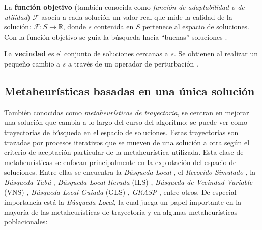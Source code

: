 \begin{definicion}
La \textbf{función objetivo} (también conocida como \emph{función de adaptabilidad o de utilidad}) $\mathcal{F}$ asocia a cada solución un valor real que mide la calidad de la solución: $\mathcal{F}: S \rightarrow \mathbb{R}$, donde $s$ contenida en $S$ pertenece al espacio de soluciones. Con la función objetivo se guía la búsqueda hacia ``buenas'' soluciones \cite{talbi2009metaheuristics}.\\
\end{definicion}


\begin{definicion}
La \textbf{vecindad} es el conjunto de soluciones cercanas a $s$. Se obtienen al realizar un pequeño cambio a $s$ a través de un operador de perturbación \cite{talbi2009metaheuristics}.
\end{definicion}

\subsection{Metaheurísticas basadas en una única solución}

También conocidas como \emph{metaheurísticas de trayectoria}, se centran en mejorar una solución que cambia a lo largo del curso del algoritmo; se puede ver como trayectorias de búsqueda en el espacio de soluciones. Estas trayectorias son trazadas por procesos iterativos que se mueven de una solución a otra según el criterio de aceptación particular de la metaheurística utilizada. Esta clase de metaheurísticas se enfocan principalmente en la explotación del espacio de soluciones. Entre ellas se encuentra la \emph{Búsqueda Local} \cite{talbi2009metaheuristics,aarts2003local}, el \emph{Recocido Simulado} \cite{talbi2009metaheuristics,kirkpatrick1983optimization}, la \emph{Búsqueda Tabú} \cite{talbi2009metaheuristics,glover1989tabu}, \emph{Búsqueda Local Iterada} (ILS) \cite{lourencco2003iterated}, \emph{Búsqueda de Vecindad Variable} (VNS) \cite{mladenovic1997variable}, \emph{Búsqueda Local Guiada} (GLS) \cite{voudouris1998guided}, \emph{GRASP} \cite{feo1995greedy}, entre otros. De especial importancia está la \emph{Búsqueda Local}, la cual juega un papel importante en la mayoría de las metaheurísticas de trayectoria y en algunas metaheurísticas poblacionales:\\ 

